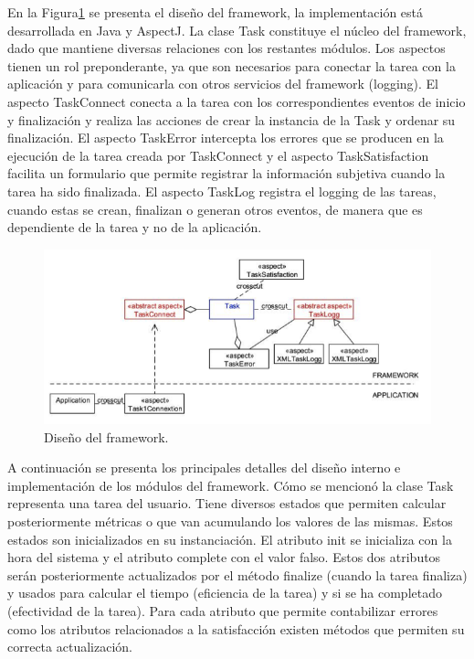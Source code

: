 En la Figura\ref{fig:fig3} se presenta el diseño del framework, la implementación está desarrollada en Java y AspectJ. La clase Task constituye el núcleo del framework, dado que mantiene diversas relaciones con los restantes módulos. Los aspectos tienen un rol preponderante, ya que son necesarios para conectar la tarea con la aplicación y para comunicarla con otros servicios del framework (logging). El aspecto TaskConnect conecta a la tarea con los correspondientes eventos de inicio y finalización y realiza las acciones de crear la instancia de la Task y ordenar su finalización. El aspecto TaskError intercepta los errores que se producen en la ejecución de la tarea creada por TaskConnect y el aspecto TaskSatisfaction facilita un formulario que permite registrar la información subjetiva cuando la tarea ha sido finalizada. El aspecto TaskLog registra el logging de las tareas, cuando estas se crean, finalizan o generan otros eventos, de manera que es dependiente de la tarea y no de la aplicación. 

\begin{figure}[ht!]
	\centering
	\includegraphics[scale=1]{figs/fig3.png}
	\caption{\label{fig:fig3}  Diseño del framework.}
\end{figure}

A continuación se presenta los principales detalles del diseño interno e implementación de los módulos del framework. Cómo se mencionó la clase Task representa una tarea del usuario. Tiene diversos estados que permiten calcular posteriormente métricas o que van acumulando los valores de las mismas. Estos estados son inicializados en su instanciación. El atributo init se inicializa con la hora del sistema y el atributo complete con el valor falso. Estos dos atributos serán posteriormente actualizados por el método finalize (cuando la tarea finaliza) y usados para calcular el tiempo (eficiencia de la tarea) y si se ha completado (efectividad de la tarea). Para cada atributo que permite contabilizar errores como los atributos relacionados a la satisfacción existen métodos que permiten su correcta actualización. 

